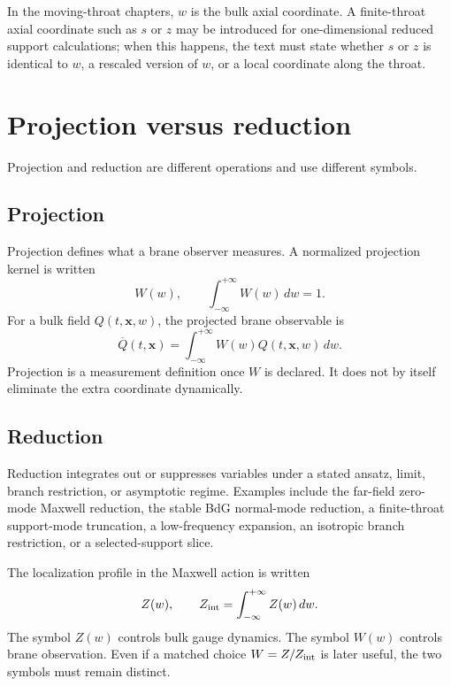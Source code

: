 In the moving-throat chapters, \(w\) is the bulk axial coordinate.  A finite-throat axial coordinate such as \(s\) or \(z\) may be introduced for one-dimensional reduced support calculations; when this happens, the text must state whether \(s\) or \(z\) is identical to \(w\), a rescaled version of \(w\), or a local coordinate along the throat.

\section{Projection versus reduction}
\label{sec:notation-projection-reduction}

Projection and reduction are different operations and use different symbols.

\subsection{Projection}
\label{subsec:notation-projection}

Projection defines what a brane observer measures.  A normalized projection kernel is written
\begin{equation}
  W(w),
  \qquad
  \int_{-\infty}^{+\infty} W(w)\,dw=1.
\end{equation}
For a bulk field \(Q(t,\mathbf x,w)\), the projected brane observable is
\begin{equation}
  \overline Q(t,\mathbf x)
  =\int_{-\infty}^{+\infty}W(w)Q(t,\mathbf x,w)\,dw.
  \label{eq:notation-projected-Q}
\end{equation}
Projection is a measurement definition once \(W\) is declared.  It does not by itself eliminate the extra coordinate dynamically.

\subsection{Reduction}
\label{subsec:notation-reduction}

Reduction integrates out or suppresses variables under a stated ansatz, limit, branch restriction, or asymptotic regime.  Examples include the far-field zero-mode Maxwell reduction, the stable BdG normal-mode reduction, a finite-throat support-mode truncation, a low-frequency expansion, an isotropic branch restriction, or a selected-support slice.

The localization profile in the Maxwell action is written
\begin{equation}
  Z(w),
  \qquad
  Z_{\rm int}=\int_{-\infty}^{+\infty}Z(w)\,dw.
\end{equation}
The symbol \(Z(w)\) controls bulk gauge dynamics.  The symbol \(W(w)\) controls brane observation.  Even if a matched choice \(W=Z/Z_{\rm int}\) is later useful, the two symbols must remain distinct.

